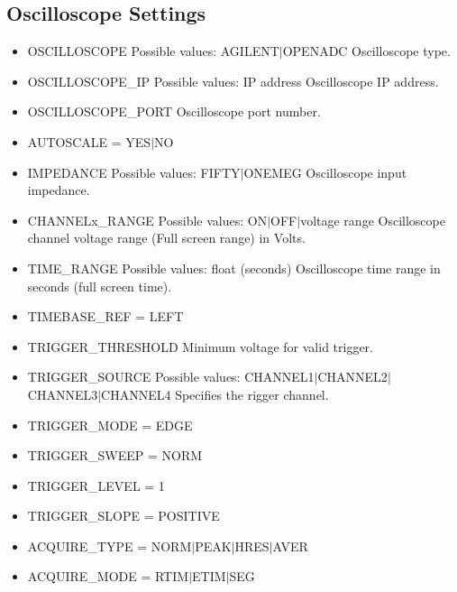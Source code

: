 \subsection{Oscilloscope Settings}
\begin{itemize}
 \item OSCILLOSCOPE \newline
 Possible values: AGILENT$|$OPENADC \newline
 Oscilloscope type.
 \item OSCILLOSCOPE\_IP \newline
 Possible values: IP address \newline
 Oscilloscope IP address.
 \item OSCILLOSCOPE\_PORT \newline
 Oscilloscope port number.
 \item AUTOSCALE = YES$|$NO \newline
 
 \item IMPEDANCE \newline
 Possible values: FIFTY$|$ONEMEG \newline
 Oscilloscope input impedance.
 \item CHANNELx\_RANGE  \newline
 Possible values: ON$|$OFF$|$voltage range \newline
 Oscilloscope channel voltage range (Full screen range) in Volts.
 \item TIME\_RANGE \newline
 Possible values: float (seconds)
 Oscilloscope time range in seconds (full screen time).
 \item TIMEBASE\_REF = LEFT    \newline
 \item TRIGGER\_THRESHOLD \newline
 Minimum voltage for valid trigger.
 \item TRIGGER\_SOURCE \newline
 Possible values: CHANNEL1$|$CHANNEL2$|$CHANNEL3$|$CHANNEL4 \newline
 Specifies the rigger channel.
 \item TRIGGER\_MODE =  EDGE
 \item TRIGGER\_SWEEP = NORM
 \item TRIGGER\_LEVEL = 1
 \item TRIGGER\_SLOPE = POSITIVE
 \item ACQUIRE\_TYPE = NORM$|$PEAK$|$HRES$|$AVER
 \item ACQUIRE\_MODE =  RTIM$|$ETIM$|$SEG

\end{itemize}

